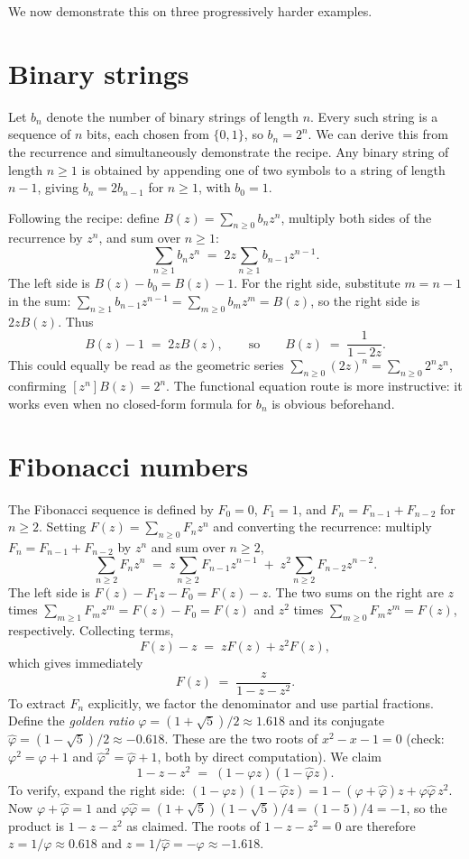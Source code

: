 We now demonstrate this on three progressively harder examples.

\section*{Binary strings}

Let $b_n$ denote the number of binary strings of length $n$. Every such string is a sequence of $n$ bits, each chosen from $\{0,1\}$, so $b_n = 2^n$. We can derive this from the recurrence and simultaneously demonstrate the recipe. Any binary string of length $n \ge 1$ is obtained by appending one of two symbols to a string of length $n-1$, giving $b_n = 2 b_{n-1}$ for $n \ge 1$, with $b_0 = 1$.

Following the recipe: define $B(z) = \sum_{n \ge 0} b_n z^n$, multiply both sides of the recurrence by $z^n$, and sum over $n \ge 1$:
\[
  \sum_{n \ge 1} b_n z^n \;=\; 2z \sum_{n \ge 1} b_{n-1} z^{n-1}.
\]
The left side is $B(z) - b_0 = B(z) - 1$. For the right side, substitute $m = n-1$ in the sum: $\sum_{n \ge 1} b_{n-1} z^{n-1} = \sum_{m \ge 0} b_m z^m = B(z)$, so the right side is $2z B(z)$. Thus
\[
  B(z) - 1 \;=\; 2z B(z), \qquad \text{so} \qquad B(z) \;=\; \frac{1}{1 - 2z}.
\]
This could equally be read as the geometric series $\sum_{n \ge 0} (2z)^n = \sum_{n \ge 0} 2^n z^n$, confirming $[z^n] B(z) = 2^n$. The functional equation route is more instructive: it works even when no closed-form formula for $b_n$ is obvious beforehand.

\section*{Fibonacci numbers}

The Fibonacci sequence is defined by $F_0 = 0$, $F_1 = 1$, and $F_n = F_{n-1} + F_{n-2}$ for $n \ge 2$. Setting $F(z) = \sum_{n \ge 0} F_n z^n$ and converting the recurrence: multiply $F_n = F_{n-1} + F_{n-2}$ by $z^n$ and sum over $n \ge 2$,
\[
  \sum_{n \ge 2} F_n z^n
  \;=\; z \sum_{n \ge 2} F_{n-1} z^{n-1}
  \;+\; z^2 \sum_{n \ge 2} F_{n-2} z^{n-2}.
\]
The left side is $F(z) - F_1 z - F_0 = F(z) - z$. The two sums on the right are $z$ times $\sum_{m \ge 1} F_m z^m = F(z) - F_0 = F(z)$ and $z^2$ times $\sum_{m \ge 0} F_m z^m = F(z)$, respectively. Collecting terms,
\[
  F(z) - z \;=\; z F(z) + z^2 F(z),
\]
which gives immediately
\[
  F(z) \;=\; \frac{z}{1 - z - z^2}.
\]
To extract $F_n$ explicitly, we factor the denominator and use partial fractions. Define the \emph{golden ratio} $\varphi = (1+\sqrt{5})/2 \approx 1.618$ and its conjugate $\hat{\varphi} = (1-\sqrt{5})/2 \approx -0.618$. These are the two roots of $x^2 - x - 1 = 0$ (check: $\varphi^2 = \varphi + 1$ and $\hat\varphi^2 = \hat\varphi + 1$, both by direct computation). We claim
\[
  1 - z - z^2 \;=\; (1 - \varphi z)(1 - \hat\varphi z).
\]
To verify, expand the right side: $(1-\varphi z)(1-\hat\varphi z) = 1 - (\varphi + \hat\varphi)z + \varphi\hat\varphi\, z^2$. Now $\varphi + \hat\varphi = 1$ and $\varphi\hat\varphi = (1+\sqrt{5})(1-\sqrt{5})/4 = (1-5)/4 = -1$, so the product is $1 - z - z^2$ as claimed. The roots of $1 - z - z^2 = 0$ are therefore $z = 1/\varphi \approx 0.618$ and $z = 1/\hat\varphi = -\varphi \approx -1.618$.

